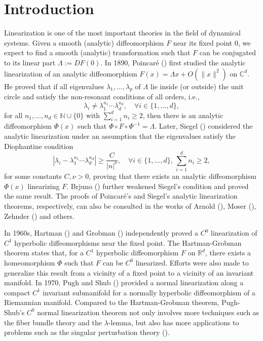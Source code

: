 \documentclass[reqno]{amsart}
\numberwithin{equation}{section}
\begin{document}
\maketitle


\section{Introduction}

Linearization is one of the most important theories in the field of dynamical systems.
Given a smooth (analytic) diffeomorphism $F$ near its fixed point $0$,
we expect to find a smooth (analytic) transformation such that $F$ can be conjugated to its linear part $\Lambda:=DF(0)$.
In 1890,  Poincar\'{e} (\cite{Poincare}) first studied the analytic linearization   of an analytic diffeomorphism $F(x) = \Lambda x + O(\|x\|^2)$ on $\mathbb{C}^d$.
He proved that if all eigenvalues $\lambda_1,...,\lambda_p$ of $\Lambda$ lie inside  (or outside) the unit circle and satisfy the non-resonant conditions of all orders, i.e.,
$$
\lambda_i\ne \lambda_1^{n_1}\cdots \lambda_d^{n_d}, \quad \forall i\in \{1,...,d\},
$$
for all $n_1,...,n_d\in \mathbb{N}\cup\{0\}$ with $\sum_{i=1}^d n_i \ge 2$, then there is an analytic diffeomorphism
$\Phi(x)$ such that $\Phi\circ F \circ \Phi^{-1}=\Lambda$.
Later, Siegel (\cite{Siegel}) considered the analytic linearization
under an assumption that the eigenvalues satisfy the Diophantine condition
$$
|\lambda_i - \lambda_1^{n_1}\cdots \lambda_d^{n_d}|\ge \frac{C}{|n|^\nu}, \quad \forall i\in \{1,...,d\},\,  \sum_{i=1}^d n_i \ge 2,
$$
for some constants $C, \nu>0$, proving that there exists an analytic diffeomorphism $\Phi(x)$ linearizing $F$.
Brjuno (\cite{Brj-7172}) further weakened Siegel's condition and proved the same result.
The proofs of Poincar\'{e}'s
and Siegel’s analytic linearization theorems, respectively,
can also be consulted in the works of Arnold (\cite{AV-book}),
Moser (\cite{Mos-66}), Zehnder (\cite{Zeh-77}) and others.


In 1960s, Hartman (\cite{Hartman}) and Grobman  (\cite{Grobman})  independently proved a $C^0$ linearization of $C^1$ hyperbolic diffeomorphisms near the fixed point.
The Hartman-Grobman theorem states that, for a \(C^1\) hyperbolic diffeomorphism \(F\) on $\mathbb{R}^d$,
there exists a homeomorphism \(\Phi\) such that $F$ can be $C^0$ linearized.
Efforts were also made to generalize this result from a vicinity of a fixed point to a vicinity of an invariant manifold.
In 1970, Pugh and Shub  (\cite{PS-InventMath})  provided a normal linearization along a compact $C^1$ invariant submanifold for a normally hyperbolic diffeomorphism of a Riemannian manifold.
Compared to the Hartman-Grobman theorem, Pugh-Shub's $C^0$ normal  linearization theorem not only involves more techniques such as the fiber bundle theory and the $\lambda$-lemma, but also has more applications to problems such as the singular perturbation theory (\cite{Fen-JDE}).
\end{document}
